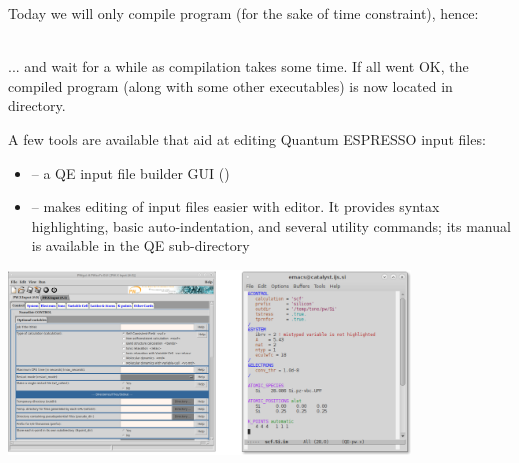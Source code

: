 \documentclass[landscape]{foils}
\begin{document}
Today we will only compile  program (for the sake of time constraint), hence:\\[0.5em]
\\

... and wait for a while as compilation takes some time. If all went
OK, the compiled  program (along with some other
executables) is now located in  directory.


\rightheader{}
\rightfooter{}
A few tools are available that aid at editing Quantum ESPRESSO input files:
\begin{itemize}
\item {} -- a QE input file builder GUI ()
\item {} -- makes editing of input files easier
  with  editor. It provides syntax highlighting, basic
  auto-indentation, and several utility commands; its manual is
  available in the QE sub-directory
\end{itemize}
\begin{center}
  \includegraphics[width=0.8\textwidth]{figs/pwgui+emacs-modes.png}
\end{center}
\end{document}
